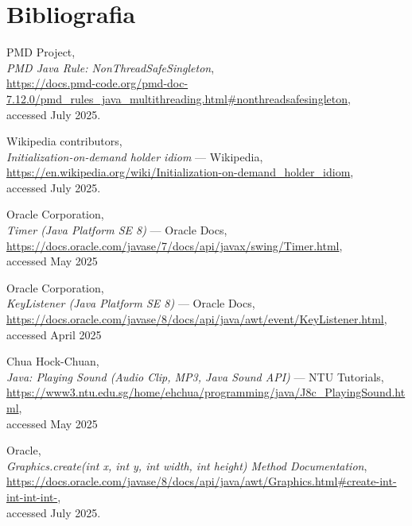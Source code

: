 \documentclass[a4paper,12pt]{report}
\begin{document}
\chapter{Bibliografia}
\begin{thebibliography}{9}

    PMD Project,\\
    \emph{PMD Java Rule: NonThreadSafeSingleton},\\
    \url{https://docs.pmd-code.org/pmd-doc-7.12.0/pmd_rules_java_multithreading.html#nonthreadsafesingleton},\\
    accessed July 2025.
    
    Wikipedia contributors,\\
    \emph{Initialization-on-demand holder idiom} --- Wikipedia,\\
    \url{https://en.wikipedia.org/wiki/Initialization-on-demand_holder_idiom},\\
    accessed July 2025.

    
    Oracle Corporation,\\
    \emph{Timer (Java Platform SE 8)} --- Oracle Docs,\\
    \url{https://docs.oracle.com/javase/7/docs/api/javax/swing/Timer.html},\\
    accessed May 2025

    Oracle Corporation,\\
    \emph{KeyListener (Java Platform SE 8)} --- Oracle Docs,\\
    \url{https://docs.oracle.com/javase/8/docs/api/java/awt/event/KeyListener.html},\\
    accessed April 2025

    Chua Hock-Chuan,\\
    \emph{Java: Playing Sound (Audio Clip, MP3, Java Sound API)} --- NTU Tutorials,\\
    \url{https://www3.ntu.edu.sg/home/ehchua/programming/java/J8c_PlayingSound.html},\\
    accessed May 2025

    Oracle,\\
    \emph{Graphics.create(int x, int y, int width, int height) Method Documentation},\\
    \url{https://docs.oracle.com/javase/8/docs/api/java/awt/Graphics.html#create-int-int-int-int-},\\
    accessed July 2025.

    \end{thebibliography}
\end{document}
